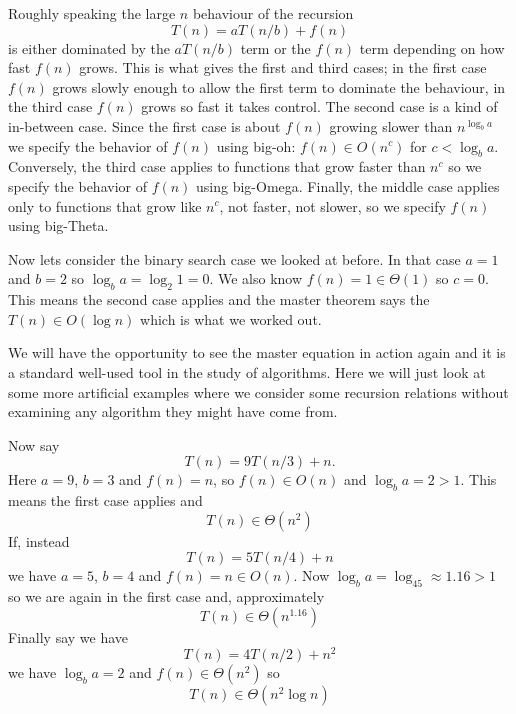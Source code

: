 \documentclass[11pt,a4paper]{scrartcl}
\begin{document}
Roughly speaking the large $n$ behaviour of the recursion
\begin{equation}
T(n)=aT(n/b)+f(n)
\end{equation}
is either dominated by the $aT(n/b)$ term or the $f(n)$ term depending
on how fast $f(n)$ grows. This is what gives the first and third
cases; in the first case $f(n)$ grows slowly enough to allow the first
term to dominate the behaviour, in the third case $f(n)$ grows so fast
it takes control. The second case is a kind of in-between case. Since
the first case is about $f(n)$ growing slower than $n^{\log_ba}$
we specify the behavior of $f(n)$ using big-oh: $f(n)\in O(n^c)$ for
$c<\log_ba$. Conversely, the third case applies to functions that grow
faster than $n^c$ so we specify the behavior of $f(n)$ using
big-Omega. Finally, the middle case applies only to functions that
grow like $n^c$, not faster, not slower, so we specify $f(n)$ using big-Theta.

Now lets consider the binary search case we looked at before. In that case
$a=1$ and $b=2$ so $\log_ba=\log_2 1=0$. We also know $f(n)=1\in \Theta(1)$
so $c=0$. This means the second case applies and the master theorem
says the $T(n)\in O(\log n)$ which is what we worked out.

We will have the opportunity to see the master equation in action
again and it is a standard well-used tool in the study of
algorithms. Here we will just look at some more artificial examples
where we consider some recursion relations without examining any
algorithm they might have come from. 

Now say
\begin{equation}
T(n)=9T(n/3)+n.
\end{equation}
Here $a=9$, $b=3$ and $f(n)=n$, so $f(n)\in O(n)$ and $\log_ba=2>1$. This means the first case applies and
\begin{equation}
T(n)\in \Theta(n^2)
\end{equation}
If, instead
\begin{equation}
T(n)=5T(n/4)+n
\end{equation}
we have $a=5$, $b=4$ and $f(n)=n\in O(n)$. Now $\log_ba=\log_45\approx 1.16>1$ so we are again in the first case and, approximately 
\begin{equation}
T(n)\in \Theta(n^{1.16})
\end{equation}
Finally say we have
\begin{equation}
T(n)=4T(n/2)+n^2
\end{equation}
we have $\log_ba=2$ and $f(n)\in \Theta(n^2)$ so
\begin{equation}
T(n)\in \Theta(n^2\log n)
\end{equation}
\end{document}
